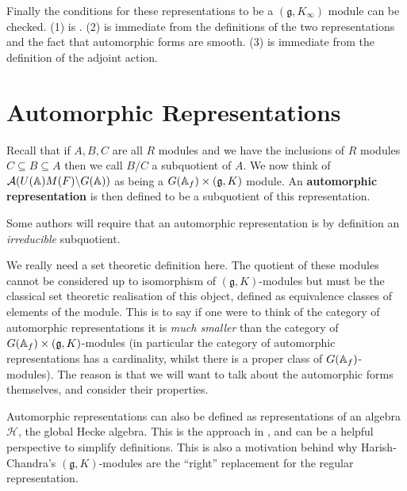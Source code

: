 Finally the conditions for these representations to be a \((\mathfrak{g}, K_\infty)\) module can be checked. (1) is \cite[Thm. 6.3.4]{getzIntroductionAutomorphicRepresentations2024}. (2) is immediate from the definitions of the two representations and the fact that automorphic forms are smooth. (3) is immediate from the definition of the adjoint action.


\section{Automorphic Representations}
Recall that if \(A, B, C\) are all \(R\) modules and we have the inclusions of \(R\) modules \(C \subseteq B \subseteq A\) then we call \(B/C\) a subquotient of \(A\). We now think of \(\mathcal{A}(U(\A)M(F)\backslash G(\A))\) as being a \(G(\A_f)\times (\mathfrak{g}, K)\) module. An \textbf{automorphic representation} is then defined to be a subquotient of this representation.
\begin{remark}
    Some authors will require that an automorphic representation is by definition an \textit{irreducible} subquotient.
\end{remark}
\begin{remark}
    We really need a set theoretic definition here. The quotient of these modules cannot be considered up to isomorphism of \((\mathfrak{g}, K)\)-modules but must be the classical set theoretic realisation of this object, defined as equivalence classes of elements of the module. This is to say if one were to think of the category of automorphic representations it is \textit{much smaller} than the category of \(G(\A_f)\times (\mathfrak{g}, K)\)-modules (in particular the category of automorphic representations has a cardinality, whilst there is a proper class of \(G(\A_f)\)-modules). The reason is that we will want to talk about the automorphic forms themselves, and consider their properties.
\end{remark}

\begin{remark}
    Automorphic representations can also be defined as representations of an algebra \(\mathcal{H}\), the global Hecke algebra. This is the approach in \cite[I.II(4.6)]{borelAutomorphicFormsRepresentations1979}, and can be a helpful perspective to simplify definitions. This is also a motivation behind why Harish-Chandra's \((\mathfrak{g}, K)\)-modules are the ``right'' replacement for the regular representation. 
\end{remark}

